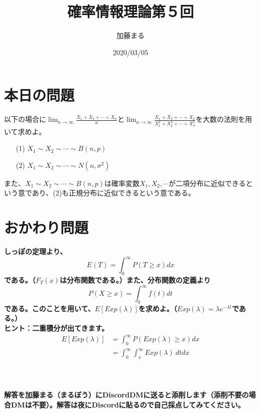 \documentclass[a4j,uplatex]{jsarticle}
\title{確率情報理論第５回}
\author{加藤まる}
\date{2020/03/05}
\begin{document}
\maketitle

\section*{本日の問題}
以下の場合に$\displaystyle \lim_{n \to \infty} \frac{X_1 + X_2 + \cdots +X_n}{n}$と$\displaystyle \lim_{n \to \infty} \frac{X_1 + X_2 + \cdots +X_n}{X_1^2 + X_2^2 + \cdots +X_n^2}$を大数の法則を用いて求めよ。
\begin{itemize}
  \item[(1)] $X_1\sim X_2\sim \cdots \sim B(n,p)$
  \item[(2)] $X_1\sim X_2\sim \cdots \sim N(n,\sigma ^2)$
\end{itemize}
また、$X_1\sim X_2\sim \cdots \sim B(n,p)$は確率変数$X_1, X_2,\cdots$が二項分布に近似できるという意であり、(2)も正規分布に近似できるという意である。


\section*{おかわり問題}
\bf しっぽの定理\rm より、
\begin{equation}
  E(T)=\int_{0}^{\infty} P(T\ge x)dx
\end{equation}
である。（$F_T (x)$は分布関数である。）また、分布関数の定義より
\begin{equation}
  P(X\ge x) = \int_{0}^{\infty} f(t)dt
\end{equation}
である。このことを用いて、$E[Exp(\lambda)]$を求めよ。（$Exp(\lambda)=\lambda e^{-\lambda t}$である。）
\\
ヒント：二重積分が出てきます。
\begin{equation}
  \begin{split}
    E[Exp(\lambda)] &= \int_{0}^{\infty} P(Exp(\lambda)\ge x)dx \\
    &=\int_{0}^{\infty} \int_{x}^{\infty} Exp(\lambda)~ dt dx
  \end{split}
\end{equation}
\\
\\
\\
解答を加藤まる（まるぼう）にDiscordDMに送ると添削します（添削不要の場合DMは不要）。解答は夜にDiscordに貼るので自己採点してみてください。
\end{document}
